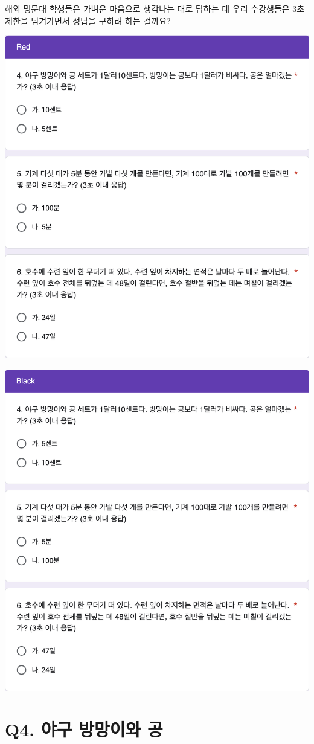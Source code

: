 \documentclass[
]{book}
\begin{document}
해외 명문대 학생들은 가벼운 마음으로 생각나는 대로 답하는 데 우리 수강생들은 3초 제한을 넘겨가면서 정답을 구하려 하는 걸까요?

\begin{flushleft}\includegraphics[width=0.67\linewidth]{./pics/Quiz240419_Q4-6_Red} \end{flushleft}

\begin{flushleft}\includegraphics[width=0.67\linewidth]{./pics/Quiz240419_Q4-6_Black} \end{flushleft}

\section{Q4. 야구 방망이와 공}\label{q4.-uxc57cuxad6c-uxbc29uxb9dduxc774uxc640-uxacf5-1}
\end{document}
